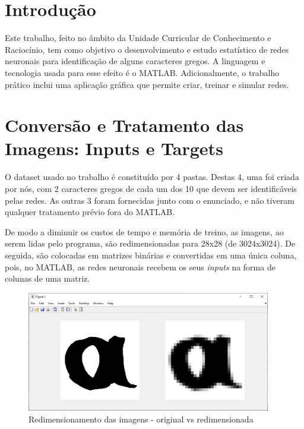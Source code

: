 \documentclass[11pt]{article}
\begin{document}
	
	
	\tableofcontents
	\pagebreak
	
	\large
	\section{Introdução}
	
	\normalsize
	Este trabalho, feito no âmbito da Unidade Curricular de Conhecimento e Raciocínio, tem como objetivo o desenvolvimento e estudo estatístico de redes neuronais para identificação de alguns caracteres gregos. A linguagem e tecnologia usada para esse efeito é o MATLAB. Adicionalmente, o trabalho prático inclui uma aplicação gráfica que permite criar, treinar e simular redes.
	
	\large
	\section{Conversão e Tratamento das Imagens: Inputs e Targets}
	\normalsize
	
	O dataset usado no trabalho é constituído por 4 pastas. Destas 4, uma foi criada por nós, com 2 caracteres gregos de cada um dos 10 que devem ser identificáveis pelas redes. As outras 3 foram fornecidas junto com o enunciado, e não tiveram qualquer tratamento prévio fora do MATLAB.
	
	De modo a diminuir os custos de tempo e memória de treino, as imagens, ao serem lidas pelo programa, são redimensionadas para 28x28 (de 3024x3024). De seguida, são colocadas em matrizes binárias e convertidas em uma única coluna, pois, no MATLAB, as redes neuronais recebem os seus \textit{inputs} na forma de colunas de uma matriz.
	
	\begin{figure}[H]
		\includegraphics[width=0.95\textwidth,height=0.88\textheight,keepaspectratio]{matlab-resize}
		\centering
		\caption{Redimensionamento das imagens - original vs redimensionada}
		\label{fig:resize}
	\end{figure}
	
\end{document}

